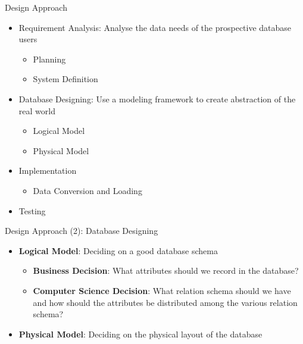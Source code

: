 \documentclass[aspectratio=169, xcolor=dvipsnames]{beamer}
\begin{document}
\begin{frame}{Design Approach}
    \begin{itemize}[<+->]
        \item Requirement Analysis: Analyse the data needs of the prospective database users
        \begin{itemize}
            \item[$\triangleright$] Planning
            \item[$\triangleright$] System Definition
        \end{itemize}
        \item Database Designing: Use a modeling framework to create abstraction of the real world
        \begin{itemize}
            \item[$\triangleright$] Logical Model
            \item[$\triangleright$] Physical Model
        \end{itemize}
        \item Implementation
        \begin{itemize}
            \item[$\triangleright$] Data Conversion and Loading
        \end{itemize}
        \item Testing
    \end{itemize}
\end{frame}

\begin{frame}{Design Approach (2): Database Designing}
    \begin{itemize}[<+->]
        \item \textbf{Logical Model}: Deciding on a good database schema
        \begin{itemize}
            \item[$\triangleright$] \textbf{Business Decision}: What attributes should we record in the database?
            \item[$\triangleright$] \textbf{Computer Science Decision}: What relation schema should we have and how should the attributes be distributed among the various relation schema?
        \end{itemize}
        \item \textbf{Physical Model}: Deciding on the physical layout of the database
    \end{itemize}
\end{frame}
\end{document}
